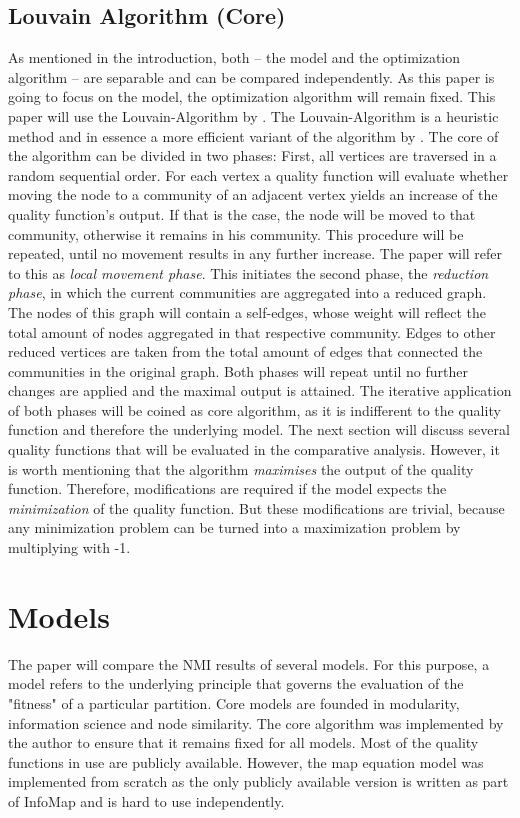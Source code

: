 \documentclass[11pt, twocolumn]{article}
\begin{document}
\subsection{Louvain Algorithm (Core)}
As mentioned in the introduction, both -- the model and the optimization algorithm -- are separable and can be compared independently. As this paper is going to focus on the model, the optimization algorithm will remain fixed. This paper will use the Louvain-Algorithm by \cite{blondel_FastUnfoldingCommunities_2008}. The Louvain-Algorithm is a heuristic method and in essence a more efficient variant of the algorithm by \citeauthor{clauset_FindingCommunityStructure_2004}. The core of the algorithm can be divided in two phases:\cite{waltman_SmartLocalMoving_2013} First, all vertices are traversed in a random sequential order. For each vertex a quality function will evaluate whether moving the node to a community of an adjacent vertex yields an increase of the quality function's output. If that is the case, the node will be moved to that community, otherwise it remains in his community. This procedure will be repeated, until no movement results in any further increase. The paper will refer to this as \emph{local movement phase}. This initiates the second phase, the \emph{reduction phase}, in which the current communities are aggregated into a reduced graph. The nodes of this graph will contain a self-edges, whose weight will reflect the total amount of nodes aggregated in that respective community. Edges to other reduced vertices are taken from the total amount of edges that connected the communities in the original graph. Both phases will repeat until no further changes are applied and the maximal output is attained. The iterative application of both phases will be coined as core algorithm, as it is indifferent to the quality function and therefore the underlying model. The next section will discuss several quality functions that will be evaluated in the comparative analysis. However, it is worth mentioning that the algorithm \emph{maximises} the output of the quality function. Therefore, modifications are required if the model expects the \emph{minimization} of the quality function. But these modifications are trivial, because any minimization problem can be turned into a maximization problem by multiplying with -1. 

\section{Models}
\label{sec:models}
The paper will compare the NMI results of several models. For this purpose, a model refers to the underlying principle that governs the evaluation of the "fitness" of a particular partition. Core models are founded in modularity, information science and node similarity. The core algorithm was implemented by the author to ensure that it remains fixed for all models. Most of the quality functions in use are publicly available. However, the map equation model was implemented from scratch as the only publicly available version is written as part of InfoMap and is hard to use independently.
\end{document}

